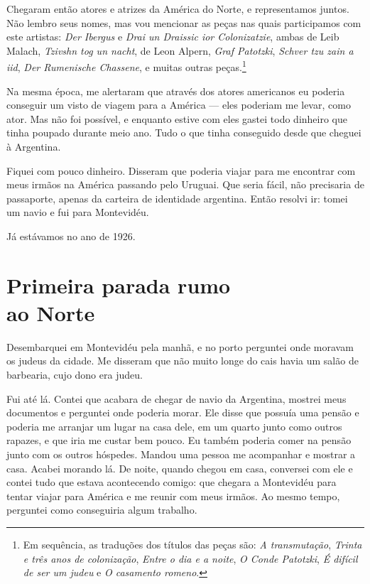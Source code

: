 Chegaram então atores e atrizes da América do Norte, e
representamos juntos. Não lembro seus nomes, mas vou mencionar as peças nas
quais participamos com este artistas: \textit{Der Ibergus} e \textit{Drai un Draissic ior Colonizatzie}, ambas de Leib Malach, \textit{Tzivshn tog un nacht}, de Leon Alpern, \textit{Graf Patotzki}, \textit{Schver tzu zain a iid}, \textit{Der Rumenische Chassene}, e
muitas outras peças.\footnote{Em sequência, as traduções dos títulos das peças são: \textit{A transmutação}, \textit{Trinta e três anos de colonização}, \textit{Entre o dia e a noite}, \textit{O Conde Patotzki}, \textit{É difícil de ser um judeu} e \textit{O casamento romeno}.}

Na mesma época, me alertaram que através dos atores americanos 
eu poderia conseguir um visto de viagem para a América --- eles poderiam me levar, como ator. Mas não foi possível, e
enquanto estive com eles gastei todo dinheiro que tinha poupado
durante meio ano. Tudo o que tinha conseguido desde que cheguei à Argentina.

Fiquei com pouco dinheiro. Disseram que poderia viajar
para me encontrar com meus irmãos na América passando pelo Uruguai.
Que seria fácil, não precisaria de passaporte, apenas da
carteira de identidade argentina. Então resolvi ir: tomei um navio e fui
para Montevidéu.

Já estávamos no ano de 1926.


\chapter*{Primeira parada rumo\\ao Norte}

Desembarquei em Montevidéu pela manhã, e no porto perguntei 
onde moravam os judeus da cidade. Me disseram que não muito
longe do cais havia um salão de barbearia, cujo dono era judeu.

Fui até lá. Contei que acabara de chegar de navio da Argentina, mostrei
meus documentos e perguntei onde poderia morar. Ele disse que possuía
uma pensão e poderia me arranjar um lugar na casa dele, em um
quarto junto como outros rapazes, e que iria me custar bem pouco. Eu
 também poderia comer na pensão junto com os outros hóspedes. Mandou uma
pessoa me acompanhar e mostrar a casa. Acabei morando lá. De noite,
quando chegou em casa, conversei com ele e contei tudo que estava
acontecendo comigo: que chegara a Montevidéu para tentar
viajar para América e me reunir com meus irmãos. Ao mesmo tempo,
perguntei como conseguiria algum trabalho.

